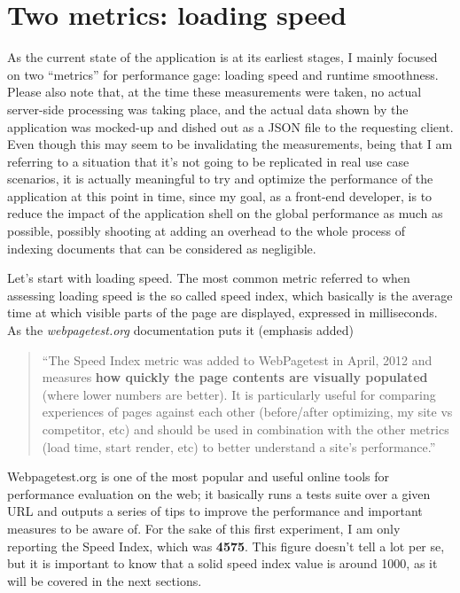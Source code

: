\documentclass[12pt,oneside,svgnames]{memoir}
\newenvironment{quotationb}%
{\color{maincolor}\begin{leftbar}\begin{quotation}}%
{\end{quotation}\end{leftbar}\ignorespacesafterend}
\begin{document}
\section{Two metrics: loading speed}\label{two-metrics-loading-speed}

As the current state of the application is at its earliest stages, I
mainly focused on two ``metrics'' for performance gage: loading speed
and runtime smoothness. Please also note that, at the time these
measurements were taken, no actual server-side processing was taking
place, and the actual data shown by the application was mocked-up and
dished out as a JSON file to the requesting client. Even though this may
seem to be invalidating the measurements, being that I am referring to a
situation that it's not going to be replicated in real use case
scenarios, it is actually meaningful to try and optimize the performance
of the application at this point in time, since my goal, as a front-end
developer, is to reduce the impact of the application shell on the
global performance as much as possible, possibly shooting at adding an
overhead to the whole process of indexing documents that can be
considered as negligible.

Let's start with loading speed. The most common metric referred to when
assessing loading speed is the so called speed index, which basically is
the average time at which visible parts of the page are displayed,
expressed in milliseconds. As the \emph{webpagetest.org} documentation
puts it (emphasis added)

\begin{quotationb}
``The Speed Index metric was added to WebPagetest in April, 2012 and
measures \textbf{how quickly the page contents are visually populated}
(where lower numbers are better). It is particularly useful for
comparing experiences of pages against each other (before/after
optimizing, my site vs competitor, etc) and should be used in
combination with the other metrics (load time, start render, etc) to
better understand a site's performance.''
\end{quotationb}

Webpagetest.org is one of the most popular and useful online tools for
performance evaluation on the web; it basically runs a tests suite over
a given URL and outputs a series of tips to improve the performance and
important measures to be aware of. For the sake of this first
experiment, I am only reporting the Speed Index, which was
\textbf{4575}. This figure doesn't tell a lot per se, but it is
important to know that a solid speed index value is around 1000, as it
will be covered in the next sections.
\end{document}
